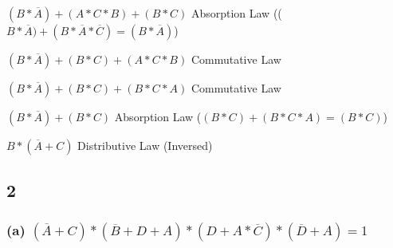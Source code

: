 \documentclass{article}
\newcommand{\boxedanswer}[1]{%

    \fbox{\large\textbf{#1}}%
}
\begin{document}
    $(B*\overline{A}) + (A*C*B) + (B*C)$ \hspace*{0.1in} Absorption Law (($B*\overline{A})+ (B*\overline{A}*\overline{C}) = (B*\overline{A})$)

    $(B*\overline{A}) + (B*C) + (A*C*B)$ \hspace*{0.1in} Commutative Law

    $(B*\overline{A}) + (B*C) + (B*C*A)$ \hspace*{0.1in} Commutative Law

    $(B*\overline{A}) + (B*C)$ \hspace*{0.1in} Absorption Law ($(B*C) + (B*C*A) = (B*C)$)

    $B*(\overline{A}+C)$ Distributive Law (Inversed)

    \vspace*{0.1in}

    \boxedanswer{$B*(\overline{A}+C)$}

    \subsection*{2}

    \subsubsection*{(a) $(\overline{A} + C) * (\overline{B} + D + A) * (D + A * \overline{C}) * (\overline{D} + A) = 1$}

    


    
\end{document}
